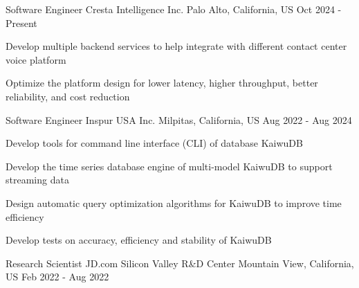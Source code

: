 


\begin{cventries}


\cventry
{Software Engineer} %
{Cresta Intelligence Inc.} %
{Palo Alto, California, US} %
{Oct 2024 - Present} %
{ %
	\begin{cvitems}
		\item {Develop multiple backend services to help integrate with different contact center voice platform}
		\item{Optimize the platform design for lower latency, higher throughput, better reliability, and cost reduction}
	\end{cvitems}
}


\cventry
{Software Engineer} %
{Inspur USA Inc.} %
{Milpitas, California, US} %
{Aug 2022 - Aug 2024} %
{ %
	\begin{cvitems}
		\item {Develop tools for command line interface (CLI) of database KaiwuDB}
		\item {Develop the time series database engine of multi-model KaiwuDB to support streaming data}
		\item {Design automatic query optimization algorithms for KaiwuDB to improve time efficiency}
		\item {Develop tests on accuracy, efficiency and stability of KaiwuDB}
	\end{cvitems}
}


\cventry
{Research Scientist} %
{JD.com Silicon Valley R\&D Center} %
{Mountain View, California, US} %
{Feb 2022 - Aug 2022} %
{ %
}


\end{cventries}
